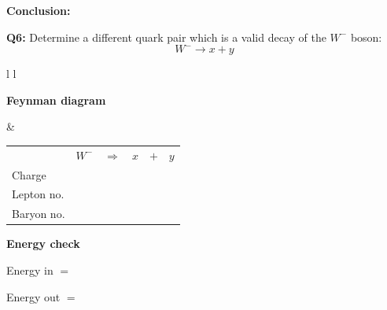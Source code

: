 \documentclass[12pt]{article}
\begin{document}
\vspace{0.5cm}

\textbf{Conclusion:}

\vspace{2.5cm}

\newpage
\textbf{Q6:} Determine a different quark pair which is a valid decay of the $W^-$ boson:
\[
W^- \rightarrow x + y
\]

\vspace{0.5cm}

\begin{tabular}{l l}

\begin{minipage}[t]{0.46\textwidth}
\vspace{0pt}
\textbf{Feynman diagram}

\vspace{0.6cm}

\begin{tikzpicture}
\begin{feynman}
  \vertex (W) at (0,2) {};
  \vertex [coordinate] (v) at (3,2) {};

  \vertex (x) at (4,4) {\(x\)};
  \vertex (y) at (5,3) {\(y\)};

  \diagram*{
    (W) -- [boson, edge label=\(W^-\), momentum'={}] (v),
    (v) -- [fermion] (x),
    (v) -- [fermion] (y),
  };
\end{feynman}
\end{tikzpicture}
\end{minipage}
&
\begin{minipage}[t]{0.50\textwidth}
\vspace{0pt}

\renewcommand{\arraystretch}{1.4}
\begin{tabular}{@{}l c c c c c@{}}
 & \(W^-\) & \(\Rightarrow\) & \(x\) & \(+\) & \(y\) \\
Charge &  &  &  &  &  \\
Lepton no. &  &  &  &  &  \\
Baryon no. &  &  &  &  &  \\
\end{tabular}

\vspace{0.6cm}

\textbf{Energy check}

Energy in $=$

Energy out $=$

\end{minipage}

\end{tabular}
\end{document}
